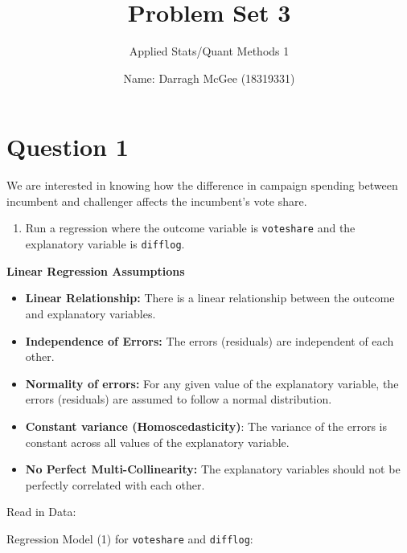 \documentclass[12pt,letterpaper]{article}
\title{Problem Set 3}
\date {Name: Darragh McGee (18319331)\\}
\author{Applied Stats/Quant Methods 1}
\begin{document}
	\maketitle
	\vspace{.5cm}
\section*{Question 1}
\vspace{.25cm}
\noindent We are interested in knowing how the difference in campaign spending between incumbent and challenger affects the incumbent's vote share. 
\noindent\begin{enumerate}[left=0pt]
\item Run a regression where the outcome variable is \texttt{voteshare} and the explanatory variable is 
\texttt{difflog}.
\end{enumerate}

\vspace{0.5cm}
\noindent\textbf{Linear Regression Assumptions}
\begin{itemize}[left=0pt]
	\item 
	\textbf{Linear Relationship:} There is a linear relationship between the outcome and explanatory variables.
	\item
	\textbf{Independence of Errors:} The errors (residuals) are independent of each other.
	\item 
	\textbf{Normality of errors:} For any given value of the explanatory variable, the errors (residuals) are assumed to follow a normal distribution.
	\item
	\textbf{Constant variance (Homoscedasticity)}: The variance of the errors is constant across all values of the explanatory variable. 
	\item
	\textbf{No Perfect Multi-Collinearity:} The explanatory variables should not be perfectly correlated with each other. 
\end{itemize}
\vspace{0.5cm}	

\noindent Read in Data:


\newpage
\noindent Regression Model (1) for \texttt{voteshare} and \texttt{difflog}: 
\noindent
\end{document}
